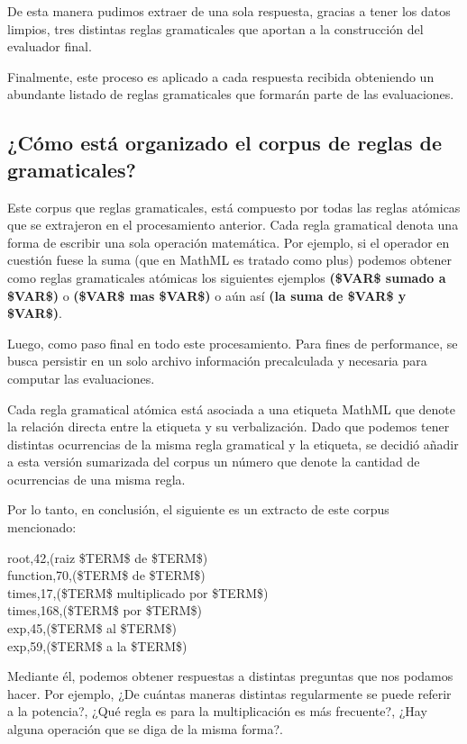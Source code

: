 De esta manera pudimos extraer de una sola respuesta, gracias a tener los datos limpios, tres distintas reglas gramaticales que aportan a la construcción del evaluador final.

Finalmente, este proceso es aplicado a cada respuesta recibida obteniendo un abundante listado de reglas gramaticales que formarán parte de las evaluaciones.

\subsection{¿Cómo está organizado el corpus de reglas de gramaticales?}

Este corpus que reglas gramaticales, está compuesto por todas las reglas atómicas que se extrajeron en el procesamiento anterior. Cada regla gramatical denota una forma de escribir una sola operación matemática. Por ejemplo, si el operador en cuestión fuese la suma (que en MathML es tratado como plus) podemos obtener como reglas gramaticales atómicas los siguientes ejemplos \textbf{(\$VAR\$ sumado a \$VAR\$)} o \textbf{(\$VAR\$ mas \$VAR\$)} o aún así \textbf{(la suma de \$VAR\$ y \$VAR\$)}.

Luego, como paso final en todo este procesamiento. Para fines de performance, se busca persistir en un solo archivo información precalculada y necesaria para computar las evaluaciones.

Cada regla gramatical atómica está asociada a una etiqueta MathML que denote la relación directa entre la etiqueta y su verbalización. Dado que podemos tener distintas ocurrencias de la misma regla gramatical y la etiqueta, se decidió añadir a esta versión sumarizada del corpus un número que denote la cantidad de ocurrencias de una misma regla.

Por lo tanto, en conclusión, el siguiente es un extracto de este corpus mencionado:

\begin{tcolorbox}
root,42,(raiz \$TERM\$ de \$TERM\$)\\
function,70,(\$TERM\$ de \$TERM\$)\\
times,17,(\$TERM\$ multiplicado por \$TERM\$)\\
times,168,(\$TERM\$ por \$TERM\$)\\
exp,45,(\$TERM\$ al \$TERM\$)\\
exp,59,(\$TERM\$ a la \$TERM\$)
\end{tcolorbox}

Mediante él, podemos obtener respuestas a distintas preguntas que nos podamos hacer. Por ejemplo, ¿De cuántas maneras distintas regularmente se puede referir a la potencia?, ¿Qué regla es para la multiplicación es más frecuente?, ¿Hay alguna operación que se diga de la misma forma?.

